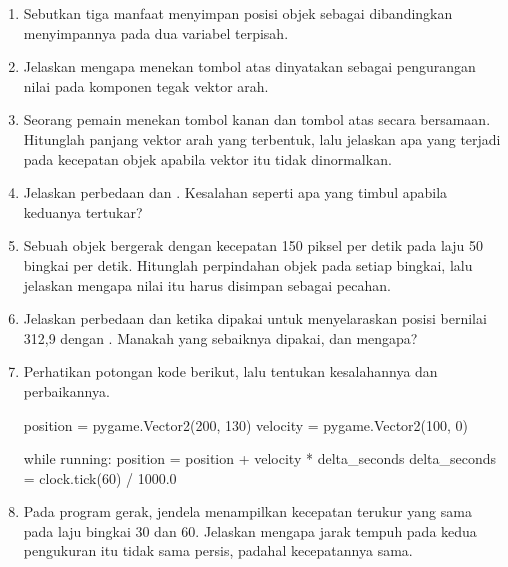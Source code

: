 
\begin{enumerate}
  \item Sebutkan tiga manfaat menyimpan posisi objek sebagai
         dibandingkan menyimpannya pada dua variabel
        terpisah.

  \item Jelaskan mengapa menekan tombol atas dinyatakan sebagai pengurangan
        nilai pada komponen tegak vektor arah.

  \item Seorang pemain menekan tombol kanan dan tombol atas secara bersamaan.
        Hitunglah panjang vektor arah yang terbentuk, lalu jelaskan apa yang
        terjadi pada kecepatan objek apabila vektor itu tidak dinormalkan.

  \item Jelaskan perbedaan  dan .
        Kesalahan seperti apa yang timbul apabila keduanya tertukar?

  \item Sebuah objek bergerak dengan kecepatan 150 piksel per detik pada laju
        50 bingkai per detik. Hitunglah perpindahan objek pada setiap bingkai,
        lalu jelaskan mengapa nilai itu harus disimpan sebagai pecahan.

  \item Jelaskan perbedaan  dan  ketika dipakai
        untuk menyelaraskan posisi bernilai 312,9 dengan . Manakah
        yang sebaiknya dipakai, dan mengapa?

  \item Perhatikan potongan kode berikut, lalu tentukan kesalahannya dan
        perbaikannya.
\begin{kodekeluaran}
position = pygame.Vector2(200, 130)
velocity = pygame.Vector2(100, 0)

while running:
    position = position + velocity * delta_seconds
    delta_seconds = clock.tick(60) / 1000.0
\end{kodekeluaran}

  \item Pada program gerak, jendela menampilkan kecepatan terukur yang sama
        pada laju bingkai 30 dan 60. Jelaskan mengapa jarak tempuh pada kedua
        pengukuran itu tidak sama persis, padahal kecepatannya sama.
\end{enumerate}

